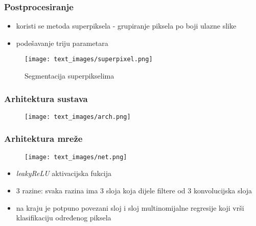 \documentclass[utf8]{beamer}
\begin{document}

\begin{frame}
\frametitle{Postprocesiranje}

\begin{itemize}
  \item koristi se metoda superpiksela - grupiranje piksela po boji ulazne slike
  \item podešavanje triju parametara
\end{itemize}

\begin{figure}[htb]
\centering
\texttt{[image: text\_images/superpixel.png]}
\caption{Segmentacija superpikselima}
\end{figure}

\end{frame}


\begin{frame}
\frametitle{Arhitektura sustava}

\begin{figure}[htb]
  \centering
  \texttt{[image: text\_images/arch.png]}
\end{figure}

\end{frame}


\begin{frame}
\frametitle{Arhitektura mreže}

\begin{figure}[htb]
\centering
\texttt{[image: text\_images/net.png]}
\end{figure}

\begin{itemize}
  \item \textit{leakyReLU} aktivacijska fukcija
  \item 3 razine: svaka razina ima 3 sloja koja dijele filtere od 3 konvolucijska sloja
  \item na kraju je potpuno povezani sloj i sloj multinomijalne regresije koji vrši klasifikaciju određenog piksela
\end{itemize}

\end{frame}

\end{document}

